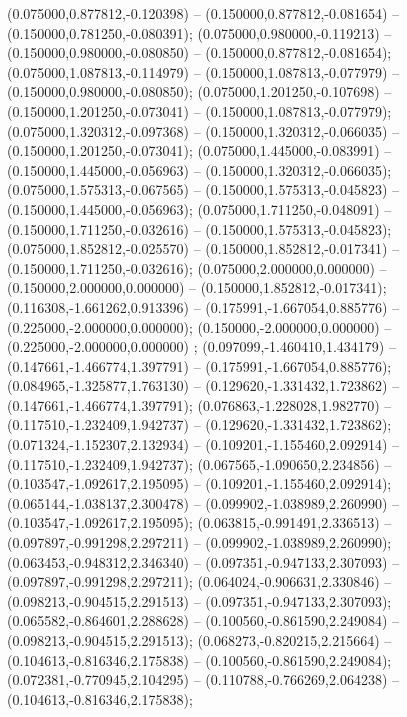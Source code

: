  (0.075000,0.877812,-0.120398) -- (0.150000,0.877812,-0.081654) -- (0.150000,0.781250,-0.080391);
 (0.075000,0.980000,-0.119213) -- (0.150000,0.980000,-0.080850) -- (0.150000,0.877812,-0.081654);
 (0.075000,1.087813,-0.114979) -- (0.150000,1.087813,-0.077979) -- (0.150000,0.980000,-0.080850);
 (0.075000,1.201250,-0.107698) -- (0.150000,1.201250,-0.073041) -- (0.150000,1.087813,-0.077979);
 (0.075000,1.320312,-0.097368) -- (0.150000,1.320312,-0.066035) -- (0.150000,1.201250,-0.073041);
 (0.075000,1.445000,-0.083991) -- (0.150000,1.445000,-0.056963) -- (0.150000,1.320312,-0.066035);
 (0.075000,1.575313,-0.067565) -- (0.150000,1.575313,-0.045823) -- (0.150000,1.445000,-0.056963);
 (0.075000,1.711250,-0.048091) -- (0.150000,1.711250,-0.032616) -- (0.150000,1.575313,-0.045823);
 (0.075000,1.852812,-0.025570) -- (0.150000,1.852812,-0.017341) -- (0.150000,1.711250,-0.032616);
 (0.075000,2.000000,0.000000) -- (0.150000,2.000000,0.000000) -- (0.150000,1.852812,-0.017341);
 (0.116308,-1.661262,0.913396) -- (0.175991,-1.667054,0.885776) -- (0.225000,-2.000000,0.000000);
 (0.150000,-2.000000,0.000000) -- (0.225000,-2.000000,0.000000) ;
 (0.097099,-1.460410,1.434179) -- (0.147661,-1.466774,1.397791) -- (0.175991,-1.667054,0.885776);
 (0.084965,-1.325877,1.763130) -- (0.129620,-1.331432,1.723862) -- (0.147661,-1.466774,1.397791);
 (0.076863,-1.228028,1.982770) -- (0.117510,-1.232409,1.942737) -- (0.129620,-1.331432,1.723862);
 (0.071324,-1.152307,2.132934) -- (0.109201,-1.155460,2.092914) -- (0.117510,-1.232409,1.942737);
 (0.067565,-1.090650,2.234856) -- (0.103547,-1.092617,2.195095) -- (0.109201,-1.155460,2.092914);
 (0.065144,-1.038137,2.300478) -- (0.099902,-1.038989,2.260990) -- (0.103547,-1.092617,2.195095);
 (0.063815,-0.991491,2.336513) -- (0.097897,-0.991298,2.297211) -- (0.099902,-1.038989,2.260990);
 (0.063453,-0.948312,2.346340) -- (0.097351,-0.947133,2.307093) -- (0.097897,-0.991298,2.297211);
 (0.064024,-0.906631,2.330846) -- (0.098213,-0.904515,2.291513) -- (0.097351,-0.947133,2.307093);
 (0.065582,-0.864601,2.288628) -- (0.100560,-0.861590,2.249084) -- (0.098213,-0.904515,2.291513);
 (0.068273,-0.820215,2.215664) -- (0.104613,-0.816346,2.175838) -- (0.100560,-0.861590,2.249084);
 (0.072381,-0.770945,2.104295) -- (0.110788,-0.766269,2.064238) -- (0.104613,-0.816346,2.175838);

